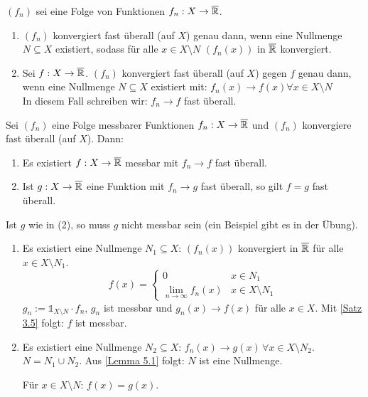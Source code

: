 \documentclass[a4paper,twoside,DIV15,BCOR12mm,chapterprefix=true,headings=onelinechapter]{scrbook}
\begin{document}
\begin{definition}
$(f_n)$ sei eine Folge von Funktionen $f_n:X\to\overline{\mathbb{R}}$.
\begin{enumerate}
\item $(f_n)$ konvergiert fast überall (auf $X$) genau dann, wenn eine Nullmenge $N\subseteq X$ existiert, sodass für alle  $x\in X\setminus N$ $\left(f_n(x)\right)$ in $\overline{\mathbb{R}}$ konvergiert.
\item Sei $f:X\to\overline{\mathbb{R}}$. $(f_n)$ konvergiert fast überall (auf $X$) gegen $f$ genau dann, wenn eine Nullmenge $N\subseteq X$ existiert mit: $f_n(x)\to f(x) \forall x\in X\setminus N$\\
In diesem Fall schreiben wir: $f_n\to f$ fast überall.
\end{enumerate}
\end{definition}

\begin{satz}
\label{Satz 5.4}
Sei \((f_{n})\) eine Folge messbarer Funktionen \(f_{n}: X\to\overline{\mathbb{R}}\) und \((f_{n})\) konvergiere fast \"uberall (auf \(X\)).
Dann:
\begin{enumerate}
\item Es existiert \(f: X\to\overline{\mathbb{R}}\) messbar mit \(f_{n}\to f\) fast \"uberall.
\item Ist \(g: X\to\overline{\mathbb{R}}\) eine Funktion mit \(f_{n}\to g\) fast \"uberall, so gilt \(f=g\) fast \"uberall.
\end{enumerate}
\end{satz}

\begin{bemerkung}
Ist \(g\) wie in (2), so muss \(g\) nicht messbar sein (ein Beispiel gibt es in der \"Ubung).
\end{bemerkung}

\begin{beweis}
\begin{enumerate}
\item Es existiert eine Nullmenge \(N_{1}\subseteq X:\,(f_{n}(x))\) konvergiert in \(\overline{\mathbb{R}}\) für alle 
\(x\in X\setminus N_{1}\).
\[
f(x)=\begin{cases}0&x\in N_{1}\\\lim_{n\to\infty}{f_{n}(x)}&x\in X\setminus N_{1}\end{cases}
\]
\(g_{n}:=\mathds{1}_{X\setminus N}\cdot f_{n}\), \(g_{n}\) ist messbar und \(g_{n}(x)\to f(x)\) für alle \(x\in X\).
Mit \ref{Satz 3.5} folgt: \(f\) ist messbar.
\item Es existiert eine Nullmenge \(N_{2}\subseteq X:\,f_{n}(x)\to g(x)\,\forall x\in X\setminus N_{2}\). 
\(N=N_{1}\cup N_{2}\). Aus \ref{Lemma 5.1} folgt: \(N\) ist eine Nullmenge. 

Für \(x\in X\setminus N:\,f(x)=g(x)\).
\end{enumerate}
\end{beweis}
\end{document}
